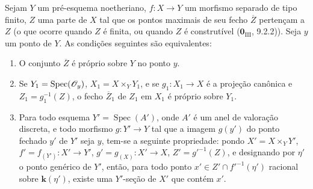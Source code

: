 \begin{corollary}[15.7.4]
\label{IV.15.7.4}
Sejam $Y$ um pré-esquema noetheriano, $f:X\to Y$ um morfismo separado de tipo finito, $Z$ uma parte de $X$ tal que os pontos maximais de seu fecho $\overline Z$ pertençam a $Z$ (o que ocorre quando $Z$ é finita, ou quando $Z$ é construtível ($\mathbf{0}_{\mathrm{III}}$, 9.2.2)). Seja $y$ um ponto de $Y$. As condições seguintes são equivalentes:
\begin{enumerate}
  \item[\rm a)] O conjunto $\overline Z$ é próprio sobre $Y$ no ponto $y$.
  \item[\rm b)] Se $Y_1=\operatorname{Spec}(\mathscr{O}_y)$, $X_1=X\times_Y Y_1$, e se $g_1:X_1\to X$ é a projeção canônica e $Z_1=g_1^{-1}(Z)$, o fecho $\overline Z_1$ de $Z_1$ em $X_1$ é próprio sobre $Y_1$.
  \item[\rm c)] Para todo esquema $Y'=\operatorname{Spec}(A')$, onde $A'$ é um anel de valoração discreta, e todo morfismo $g:Y'\to Y$ tal que a imagem $g(y')$ do ponto fechado $y'$ de $Y'$ seja $y$, tem-se a seguinte propriedade: pondo $X'=X\times_Y Y'$, $f'=f_{(Y')}:X'\to Y'$, $g'=g_{(X)}:X'\to X$, $Z'=g'^{-1}(Z)$, e designando por $\eta'$
o ponto genérico de $Y'$, então, para todo ponto $x'\in Z'\cap f'^{-1}(\eta')$ racional sobre $\mathbf k(\eta')$, existe uma $Y'$-seção de $X'$ que contém $x'$.
\end{enumerate}
\end{corollary}

